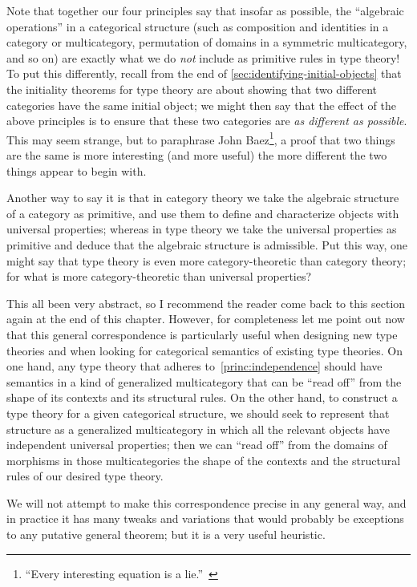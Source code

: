 \documentclass{book}
\begin{document}
Note that together our four principles say that insofar as possible, the ``algebraic operations'' in a categorical structure (such as composition and identities in a category or multicategory, permutation of domains in a symmetric multicategory, and so on) are exactly what we do \emph{not} include as primitive rules in type theory!
To put this differently, recall from the end of \cref{sec:identifying-initial-objects} that the initiality theorems for type theory are about showing that two different categories have the same initial object; we might then say that the effect of the above principles is to ensure that these two categories are \emph{as different as possible}.
This may seem strange, but to paraphrase John Baez\footnote{``Every interesting equation is a lie.''~\cite{baez:why-ncats}}, a proof that two things are the same is more interesting (and more useful) the more different the two things appear to begin with.

Another way to say it is that in category theory we take the algebraic structure of a category as primitive, and use them to define and characterize objects with universal properties; whereas in type theory we take the universal properties as primitive and deduce that the algebraic structure is admissible.
Put this way, one might say that type theory is even more category-theoretic than category theory; for what is more category-theoretic than universal properties?

This all been very abstract, so I recommend the reader come back to this section again at the end of this chapter.
However, for completeness let me point out now that this general correspondence is particularly useful when designing new type theories and when looking for categorical semantics of existing type theories.
On one hand, any type theory that adheres to~\eqref{princ:independence} should have semantics in a kind of generalized multicategory that can be ``read off'' from the shape of its contexts and its structural rules.
On the other hand, to construct a type theory for a given categorical structure, we should seek to represent that structure as a generalized multicategory in which all the relevant objects have independent universal properties; then we can ``read off'' from the domains of morphisms in those multicategories the shape of the contexts and the structural rules of our desired type theory.

We will not attempt to make this correspondence precise in any general way, and in practice it has many tweaks and variations that would probably be exceptions to any putative general theorem; but it is a very useful heuristic.
\end{document}
